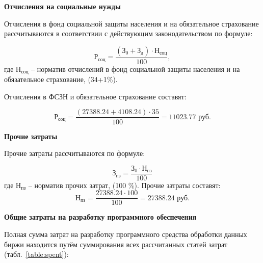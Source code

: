 \textbf{Отчисления на социальные нужды}

Отчисления в фонд социальной защиты населения и на обязательное страхование рассчитываются в соответствии с действующим законодательством по формуле:

\begin{equation}
    \textit{Р}_\textit{соц} = \frac{(\textit{З}_0 + \textit{З}_\textit{д}) \cdot \textit{Н}_\textit{соц}}{100},
\end{equation}
где $\textit{Н}_\textit{соц}$ – норматив отчислений в фонд социальной защиты населения и на обязательное страхование, (34+1\%). 

Отчисления в ФСЗН и обязательное страхование составят:

\begin{equation}
    \textit{Р}_\textit{соц} = \frac{(27388.24 + 4108.24) \cdot 35}{100} = 11023.77 \textrm{ руб.}
\end{equation}

\textbf{Прочие затраты}

Прочие затраты рассчитываются по формуле:

\begin{equation}
    \textit{З}_\textit{пз} = \frac{\textit{З}_0 \cdot \textit{Н}_\textit{пз}}{100}
\end{equation}
где $\textit{Н}_\textit{пз}$ – норматив прочих затрат, (100 \%).
Прочие затраты составят:
\begin{equation}
    \textit{Н}_\textit{пз} = \frac{27388.24 \cdot 100}{100} = 27388.24 \textrm{ руб.}
\end{equation}

\textbf{Общие затраты на разработку программного обеспечения}

Полная сумма затрат на разработку программного средства обработки данных биржи находится путём суммирования всех рассчитанных статей затрат (табл.~\ref{table:spent}):

